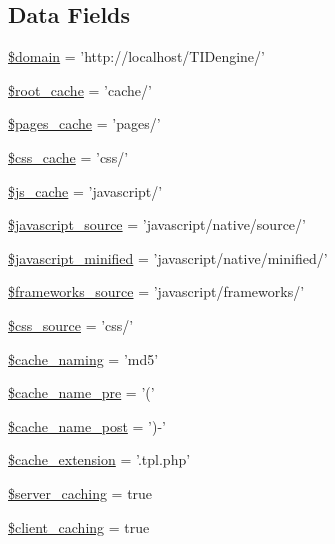 \subsection*{Data Fields}
\begin{DoxyCompactItemize}
\item 
\hyperlink{group__paths__settings_gaef9cf198312d2f89238a8e8e2f0f67f3}{\$domain} = 'http://localhost/TIDengine/'
\item 
\hyperlink{group__paths__settings_gae39d9273ea31335b789e7d9a65ddd5e5}{\$root\_\-cache} = 'cache/'
\item 
\hyperlink{group__paths__settings_ga63fb01efe0d6e48b4ec22d087e8146fb}{\$pages\_\-cache} = 'pages/'
\item 
\hyperlink{group__paths__settings_ga0e80adb33d63c6d68ba4c65404df2f94}{\$css\_\-cache} = 'css/'
\item 
\hyperlink{group__paths__settings_ga16d37062fd28b17ccfbbc08ce3e0b776}{\$js\_\-cache} = 'javascript/'
\item 
\hyperlink{group__paths__settings_ga2f10132b94f95d29119dbfc721ec89f5}{\$javascript\_\-source} = 'javascript/native/source/'
\item 
\hyperlink{group__paths__settings_gaf110565a1dfb60e0e30898d5087688be}{\$javascript\_\-minified} = 'javascript/native/minified/'
\item 
\hyperlink{group__paths__settings_ga35ab8cb7ae69ec347b63dda82a173005}{\$frameworks\_\-source} = 'javascript/frameworks/'
\item 
\hyperlink{group__paths__settings_ga117298df65ff2026617e125d21463b93}{\$css\_\-source} = 'css/'
\item 
\hyperlink{group__general__cache__settings_gad3689303b91750b4f90511e1ab46a75c}{\$cache\_\-naming} = 'md5'
\item 
\hyperlink{group__general__cache__settings_gac05f99a6b3c71f3e31e77d5c9ea5914d}{\$cache\_\-name\_\-pre} = '('
\item 
\hyperlink{group__general__cache__settings_ga0b2dfab31e245d074c86967134122b25}{\$cache\_\-name\_\-post} = ')-\/'
\item 
\hyperlink{group__general__cache__settings_gac1516832f9aecd303dcb275d08e97efe}{\$cache\_\-extension} = '.tpl.php'
\item 
\hyperlink{group__general__cache__settings_ga94cbab658bf158b39afd90db1a44e581}{\$server\_\-caching} = true
\item 
\hyperlink{group__general__cache__settings_gaa239a3baf57ffc17ad1cc1911414b539}{\$client\_\-caching} = true
\item 

\end{DoxyCompactItemize}
